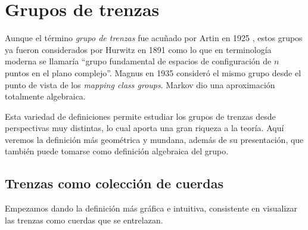 \documentclass[bibtex, anon]{TEMat-article}
\begin{document}
\section{Grupos de trenzas}



Aunque el término \emph{grupo de trenzas} fue acuñado por Artin en 1925 \cite{ArtinA}, estos grupos ya fueron considerados por Hurwitz en 1891 \cite{Hur} como lo que en terminología moderna se llamaría ``grupo fundamental de espacios de configuración de $n$ puntos en el plano complejo''. Magnus en 1935 \cite{Magnus} consideró el mismo grupo desde el punto de vista de los \emph{mapping class groups}. Markov \cite{Markoff} dio una aproximación totalmente algebraica. 

 Esta variedad de definiciones permite estudiar los grupos de trenzas desde perspectivas muy distintas, lo cual aporta una gran riqueza a la teoría. Aquí veremos la definición más geométrica y mundana, además de su presentación, que también puede tomarse como definición algebraica del grupo.
 
 \subsection{Trenzas como colección de cuerdas}
 Empezamos dando la definición más gráfica e intuitiva, consistente en visualizar las trenzas como cuerdas que se entrelazan. 
 
\end{document}

